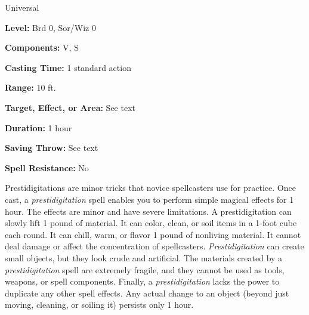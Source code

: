 
Universal

\textbf{Level:} Brd 0, Sor/Wiz 0

\textbf{Components:} V, S

\textbf{Casting Time:} 1 standard action

\textbf{Range:} 10 ft.

\textbf{Target, Effect, or Area:} See text

\textbf{Duration:} 1 hour

\textbf{Saving Throw:} See text

\textbf{Spell Resistance:} No

Prestidigitations are minor tricks that novice spellcasters use for practice. Once 
cast, a \textit{prestidigitation} spell enables you to perform simple magical effects 
for 1 hour. The effects are minor and have severe limitations. A prestidigitation 
can slowly lift 1 pound of material. It can color, clean, or soil items in a 1-foot 
cube each round. It can chill, warm, or flavor 1 pound of nonliving material. It 
cannot deal damage or affect the concentration of spellcasters. \textit{Prestidigitation 
}can create small objects, but they look crude and artificial. The materials created 
by a \textit{prestidigitation} spell are extremely fragile, and they cannot be 
used as tools, weapons, or spell components. Finally, a \textit{prestidigitation 
}lacks the power to duplicate any other spell effects. Any actual change to an 
object (beyond just moving, cleaning, or soiling it) persists only 1 hour.

